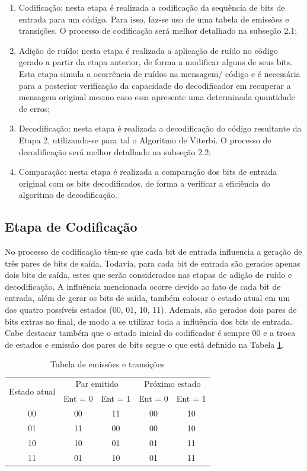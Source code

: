 \documentclass[12pt]{article}
\begin{document}
\begin{enumerate}
    \item Codificação: nesta etapa é realizada a codificação da sequência de bits de entrada para um código. Para isso, faz-se uso de uma tabela de emissões e transições. O processo de codificação será melhor detalhado na subseção 2.1;
    \item Adição de ruído: nesta etapa é realizada a aplicação de ruído no código gerado a partir da etapa anterior, de forma a modificar alguns de seus bits. Esta etapa simula a ocorrência de ruídos na mensagem/ código e é necessária para a posterior verificação da capacidade do decodificador em recuperar a mensagem original mesmo caso essa apresente uma determinada quantidade de erros;
    \item Decodificação: nesta etapa é realizada a decodificação do código resultante da Etapa 2, utilizando-se para tal o Algoritmo de Viterbi. O processo de decodificação será melhor detalhado na subseção 2.2;
    \item Comparação: nesta etapa é realizada a comparação dos bits de entrada original com os bits decodificados, de forma a verificar a eficiência do algoritmo de decodificação.
\end{enumerate}

\subsection{Etapa de Codificação}

No processo de codificação têm-se que cada bit de entrada influencia a geração de três pares de bits de saída. Todavia, para cada bit de entrada são gerados apenas dois bits de saída, estes que serão considerados nas etapas de adição de ruído e decodificação. A influência mencionada ocorre devido ao fato de cada bit de entrada, além de gerar os bits de saída, também colocar o estado atual em um dos quatro possíveis estados (00, 01, 10, 11). Ademais, são gerados dois pares de bits extras no final, de modo a se utilizar toda a influência dos bits de entrada. Cabe destacar também que o estado inicial do codificador é sempre 00 e a troca de estados e emissão dos pares de bits segue o que está definido na Tabela \ref{transTable}.

\begin{table}[!h]
\centering
\caption{Tabela de emissões e transições}
\label{transTable}
\def\arraystretch{1.2}
\begin{tabular}{|c|c|c|c|c|}
\hline
\multicolumn{1}{|c|}{\multirow{2}{*}{Estado atual}} & \multicolumn{2}{c|}{Par emitido} & \multicolumn{2}{c|}{Próximo estado} \\ \cline{2-5} 
\multicolumn{1}{|c|}{} & \multicolumn{1}{c|}{Ent = 0} & \multicolumn{1}{c|}{Ent = 1} & \multicolumn{1}{c|}{Ent = 0} & \multicolumn{1}{c|}{Ent = 1} \\ \hline
00 & 00 & 11 & 00 & 10 \\ \hline
01 & 11 & 00 & 00 & 10 \\ \hline
10 & 10 & 01 & 01 & 11 \\ \hline
11 & 01 & 10 & 01 & 11 \\ \hline
\end{tabular}
\end{table}
\end{document}
